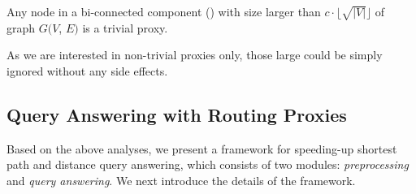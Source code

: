 \begin{prop}
\label{prop-large-bcc} Any node in a bi-connected component (\bc)  with size larger than $c\cdot\lfloor\sqrt{|V|}\rfloor$ of graph $G(V$, $E)$ is a trivial proxy.
\end{prop}



As we are interested in non-trivial proxies only, those large \bccs could be simply ignored without any side effects.



\subsection{Query Answering with Routing Proxies}
\label{subsec-proxy-query}




 Based on the above analyses, we present a framework for speeding-up shortest  path and distance query answering, which consists of two modules: {\em preprocessing} and {\em query answering}. 
 We next introduce the details of the framework.

